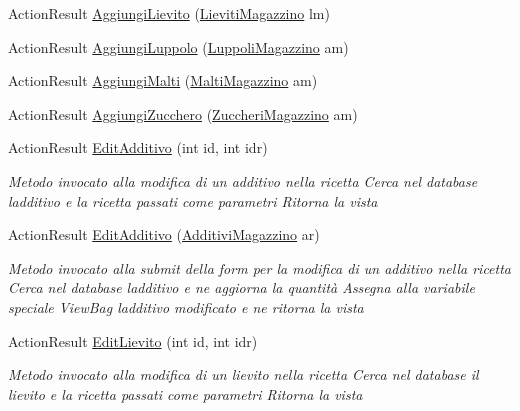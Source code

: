\begin{DoxyCompactItemize}
Action\+Result \mbox{\hyperlink{class_brew_day2_1_1_controllers_1_1_magazzino_controller_ab45f07125eff444053d68184e3c23319}{Aggiungi\+Lievito}} (\mbox{\hyperlink{class_brew_day2_1_1_models_1_1_lieviti_magazzino}{Lieviti\+Magazzino}} lm)
\item 
Action\+Result \mbox{\hyperlink{class_brew_day2_1_1_controllers_1_1_magazzino_controller_a0f976402c518d1a6bbcf316911128620}{Aggiungi\+Luppolo}} (\mbox{\hyperlink{class_brew_day2_1_1_models_1_1_luppoli_magazzino}{Luppoli\+Magazzino}} am)
\item 
Action\+Result \mbox{\hyperlink{class_brew_day2_1_1_controllers_1_1_magazzino_controller_a06972dbc970850c6562fd7806cac02c9}{Aggiungi\+Malti}} (\mbox{\hyperlink{class_brew_day2_1_1_models_1_1_malti_magazzino}{Malti\+Magazzino}} am)
\item 
Action\+Result \mbox{\hyperlink{class_brew_day2_1_1_controllers_1_1_magazzino_controller_afe741db46e9b574bf6f24ccbfa6b2b30}{Aggiungi\+Zucchero}} (\mbox{\hyperlink{class_brew_day2_1_1_models_1_1_zuccheri_magazzino}{Zuccheri\+Magazzino}} am)
\item 
Action\+Result \mbox{\hyperlink{class_brew_day2_1_1_controllers_1_1_magazzino_controller_af8a9e46f0163c13ee2fdbd51bcc9e445}{Edit\+Additivo}} (int id, int idr)
\begin{DoxyCompactList}\small\item\em Metodo invocato alla modifica di un additivo nella ricetta Cerca nel database l\textquotesingle{}additivo e la ricetta passati come parametri Ritorna la vista \end{DoxyCompactList}\item 
Action\+Result \mbox{\hyperlink{class_brew_day2_1_1_controllers_1_1_magazzino_controller_a800d0af3879b8ce298707b0d1072c640}{Edit\+Additivo}} (\mbox{\hyperlink{class_brew_day2_1_1_models_1_1_additivi_magazzino}{Additivi\+Magazzino}} ar)
\begin{DoxyCompactList}\small\item\em Metodo invocato alla submit della form per la modifica di un additivo nella ricetta Cerca nel database l\textquotesingle{}additivo e ne aggiorna la quantità Assegna alla variabile speciale View\+Bag l\textquotesingle{}additivo modificato e ne ritorna la vista \end{DoxyCompactList}\item 
Action\+Result \mbox{\hyperlink{class_brew_day2_1_1_controllers_1_1_magazzino_controller_a50bd39377dbd3b58301360246e211a05}{Edit\+Lievito}} (int id, int idr)
\begin{DoxyCompactList}\small\item\em Metodo invocato alla modifica di un lievito nella ricetta Cerca nel database il lievito e la ricetta passati come parametri Ritorna la vista \end{DoxyCompactList}\item 

\end{DoxyCompactItemize}
